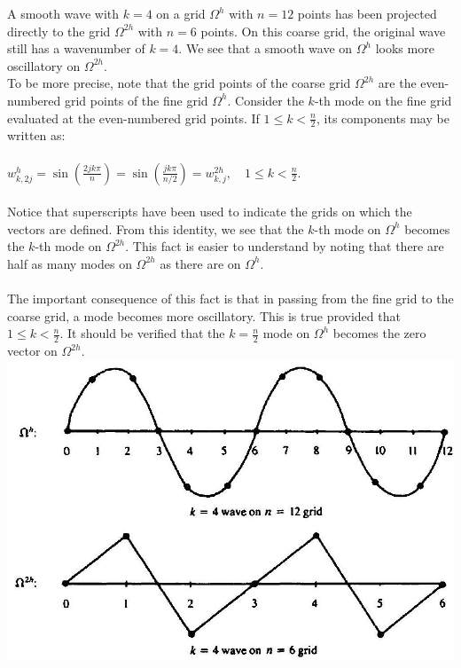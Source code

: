 \documentclass[11pt]{book}
\begin{document}
A smooth wave with $k=4$ on a grid $\Omega^{h}$ with $n=12$ points has been projected directly to the grid $\Omega^{2 h}$ with $n=6$ points. On this coarse grid, the original wave still has a wavenumber of $k=4$. We see that a smooth wave on $\Omega^{h}$ looks more oscillatory on $\Omega^{2 h}$. \\
To be more precise, note that the grid points of the coarse grid $\Omega^{2 h}$ are the even-numbered grid points of the fine grid $\Omega^{h}$. Consider the $k$-th mode on the fine grid evaluated at the even-numbered grid points. If $1 \leq k<\frac{n}{2}$, its components may be written as:\\ \\
$  w_{k, 2 j}^{h}=\sin \left(\frac{2 j k \pi}{n}\right)=\sin \left(\frac{j k \pi}{n / 2}\right)=w_{k, j}^{2 h}, \quad 1 \leq k<\frac{n}{2}$. \\ \\
Notice that superscripts have been used to indicate the grids on which the vectors are defined. From this identity, we see that the $k$-th mode on $\Omega^{h}$ becomes the $k$-th mode on $\Omega^{2 h}$. This fact is easier to understand by noting that there are half as many modes on $\Omega^{2 h}$ as there are on $\Omega^{h}$.\\ \\
The important consequence of this fact is that in passing from the fine grid to the coarse grid, a mode becomes more oscillatory. This is true provided that $1 \leq k<\frac{n}{2}$. It should be verified that the $k=\frac{n}{2}$ mode on $\Omega^{h}$ becomes the zero vector on $\Omega^{2 h}$.\\
\includegraphics[max width=\textwidth, center]{2023_10_10_f3de0b9400b097aecf14g-045}\\
\end{document}
